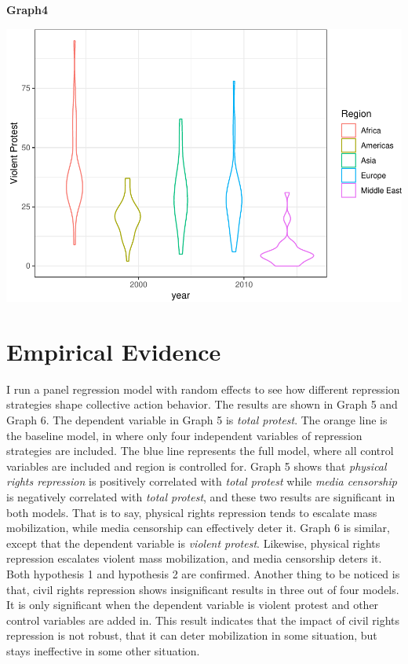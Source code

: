 \documentclass[11pt,]{article}
\begin{document}
\begin{center}
    \textbf{Graph4}
\end{center}

\includegraphics{replication_files/figure-latex/unnamed-chunk-5-1.pdf}

\section{Empirical Evidence}

I run a panel regression model with random effects to see how different
repression strategies shape collective action behavior. The results are
shown in Graph 5 and Graph 6. The dependent variable in Graph 5 is
\textit{total protest}. The orange line is the baseline model, in where
only four independent variables of repression strategies are included.
The blue line represents the full model, where all control variables are
included and region is controlled for. Graph 5 shows that
\textit{physical rights repression} is positively correlated with
\textit{total protest} while \textit{media censorship} is negatively
correlated with \textit{total protest}, and these two results are
significant in both models. That is to say, physical rights repression
tends to escalate mass mobilization, while media censorship can
effectively deter it. Graph 6 is similar, except that the dependent
variable is \textit{violent protest}. Likewise, physical rights
repression escalates violent mass mobilization, and media censorship
deters it. Both hypothesis 1 and hypothesis 2 are confirmed. Another
thing to be noticed is that, civil rights repression shows insignificant
results in three out of four models. It is only significant when the
dependent variable is violent protest and other control variables are
added in. This result indicates that the impact of civil rights
repression is not robust, that it can deter mobilization in some
situation, but stays ineffective in some other situation.
\end{document}
